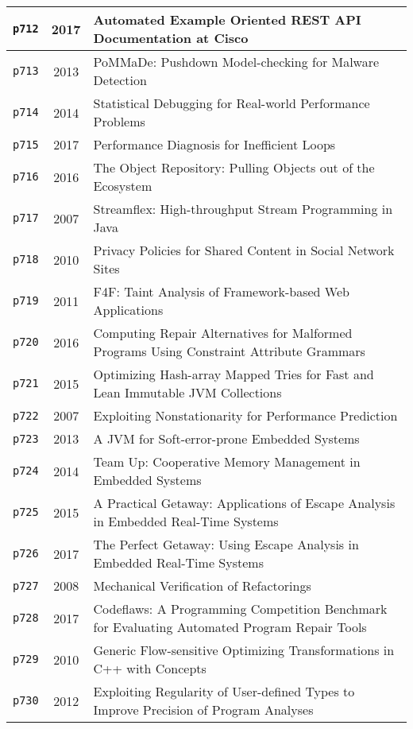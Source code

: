 \begin{longtable}{| c | c | p{16cm} |}
  \hline
  \texttt{p712} & 2017 & Automated Example Oriented REST API Documentation at Cisco \\
  \hline
  \texttt{p713} & 2013 & PoMMaDe: Pushdown Model-checking for Malware Detection \\
  \hline
  \texttt{p714} & 2014 & Statistical Debugging for Real-world Performance Problems \\
  \hline
  \texttt{p715} & 2017 & Performance Diagnosis for Inefficient Loops \\
  \hline
  \texttt{p716} & 2016 & The Object Repository: Pulling Objects out of the Ecosystem \\
  \hline
  \texttt{p717} & 2007 & Streamflex: High-throughput Stream Programming in Java \\
  \hline
  \texttt{p718} & 2010 & Privacy Policies for Shared Content in Social Network Sites \\
  \hline
  \texttt{p719} & 2011 & F4F: Taint Analysis of Framework-based Web Applications \\
  \hline
  \texttt{p720} & 2016 & Computing Repair Alternatives for Malformed Programs Using Constraint Attribute Grammars \\
  \hline
  \texttt{p721} & 2015 & Optimizing Hash-array Mapped Tries for Fast and Lean Immutable JVM Collections \\
  \hline
  \texttt{p722} & 2007 & Exploiting Nonstationarity for Performance Prediction \\
  \hline
  \texttt{p723} & 2013 & A JVM for Soft-error-prone Embedded Systems \\
  \hline
  \texttt{p724} & 2014 & Team Up: Cooperative Memory Management in Embedded Systems \\
  \hline
  \texttt{p725} & 2015 & A Practical Getaway: Applications of Escape Analysis in Embedded Real-Time Systems \\
  \hline
  \texttt{p726} & 2017 & The Perfect Getaway: Using Escape Analysis in Embedded Real-Time Systems \\
  \hline
  \texttt{p727} & 2008 & Mechanical Verification of Refactorings \\
  \hline
  \texttt{p728} & 2017 & Codeflaws: A Programming Competition Benchmark for Evaluating Automated Program Repair Tools \\
  \hline
  \texttt{p729} & 2010 & Generic Flow-sensitive Optimizing Transformations in C++ with Concepts \\
  \hline
  \texttt{p730} & 2012 & Exploiting Regularity of User-defined Types to Improve Precision of Program Analyses \\

\end{longtable}
